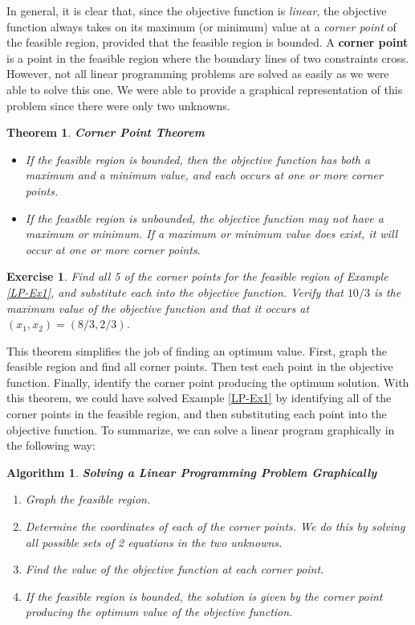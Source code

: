 \documentclass[letterpaper,10pt]{article}
\newtheorem{thm}{Theorem}
\newtheorem{ex}{Exercise}
\newtheorem{alg}{Algorithm}%
\begin{document}
In general, it is clear that, since the objective function is {\em linear}, the objective function always takes on its maximum (or minimum) value at a {\em corner point} of the feasible region, provided that the feasible region is bounded.  A {\bf corner point} is a point in the feasible region where the boundary lines of two constraints cross.  However, not all linear programming problems are solved as easily as we were able to solve this one.  We were able to provide a graphical representation of this problem since there were only two unknowns.  



\begin{thm}{\bf Corner Point Theorem}

\begin{itemize} 

\item If the feasible region is bounded, then the objective function has both a maximum and a minimum value, and each occurs at one or more corner points.


\item If the feasible region is unbounded, the objective function may not have a maximum or minimum.  If a maximum or minimum value does exist, it will occur at one or more corner points.

\end{itemize}
\end{thm}

\begin{ex}
Find all 5 of the corner points for the feasible region of Example \ref{LP-Ex1}, and substitute each into the objective function.  Verify that $10/3$ is the maximum value of the objective function and that it occurs at $\displaystyle(x_1,x_2) = (8/3,2/3)$.
\end{ex}

This theorem simplifies the job of finding an optimum value. First, graph the feasible region and find all corner points. Then test each point in the objective function. Finally, identify the corner point producing the optimum solution. With this theorem, we could have solved Example \ref{LP-Ex1} by identifying all of the corner points in the feasible region, and then substituting each point into the objective function.  To summarize, we can solve a linear program graphically in the following way:

\begin{alg}{\bf Solving a Linear Programming Problem Graphically}
\begin{enumerate}
\item Graph the feasible region.
\item Determine the coordinates of each of the corner points.  We do this by solving all possible sets of 2 equations in the two unknowns.
\item Find the value of the objective function at each corner point.
\item  If the feasible region is bounded, the solution is given by the corner point producing the optimum value of the objective function.

\end{enumerate}
\end{alg}
\end{document}
